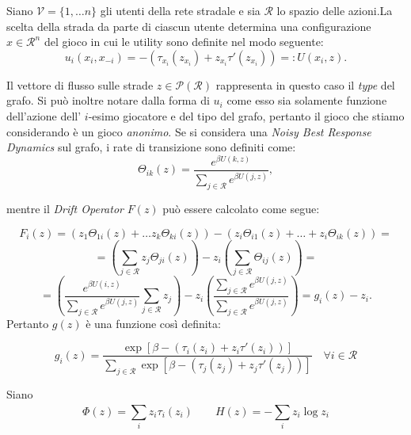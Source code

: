 \begin{alphaparts}
\questionpart %
Siano \(\mathcal{V} = \{1, \dots n\}\) gli utenti della rete stradale e sia \(\mathcal{R}\) lo spazio delle azioni.La scelta della strada da parte di ciascun utente determina una configurazione \(x \in \mathcal{R}^n\) del gioco in cui le utility sono definite nel modo seguente:
\[
    u_i (x_i, x_{- i}) = - (\tau_{x_i}(z_{x_i}) + z_{x_i}\tau'(z_{x_i})) = : U(x_{i}, z).\]

Il vettore di flusso sulle strade \(z \in \mathcal{P}(\mathcal{R})\) rappresenta in questo caso il \textit{type} del grafo. Si può inoltre notare dalla forma di \(u_i\) come esso sia solamente funzione dell'azione dell' \(i\)-esimo giocatore e del tipo del grafo, pertanto il gioco che stiamo considerando è un gioco \textit{anonimo}. Se si considera una \textit{Noisy Best Response Dynamics} sul grafo, i rate di transizione sono definiti come:
\begin{equation*}
    \Theta_{ik}(z) = \frac{e^{\beta U(k, z)}}{ \sum \limits_{j \in \mathcal{R}}^{} e^{\beta U(j, z)}},
\end{equation*} 

mentre il \textit{Drift Operator} \(F(z)\) può essere calcolato come segue:

\[
F_i(z) = (z_1 \Theta_{1i}(z) + \dots z_k \Theta_{ki}(z) ) - (z_i \Theta_{i1}(z) + \dots + z_i \Theta_{ik}(z) ) =
\]
\[ 
 = \left(\sum \limits_{j \in \mathcal{R}}^{} z_j \Theta_{ji}(z) \right) - z_i \left( \sum \limits_{j \in \mathcal{R}}^{} \Theta_{ij}(z)\right) =    
\]
\[
    = \left(\frac{e^{\beta U(i, z)}}{ \sum \limits_{j \in \mathcal{R}}^{} e^{\beta U(j, z)}}  \sum \limits_{j \in \mathcal{R}}^{} z_j \right) - z_i \left( \frac{\sum \limits_{j \in \mathcal{R}}^{} e^{\beta U(j, z)}}{ \sum \limits_{j \in \mathcal{R}}^{} e^{\beta U(j, z)}}\right) = g_i(z) - z_i.
\]
Pertanto \(g(z)\) è una funzione così definita:

\begin{equation*}
    g_i(z) = \frac{\exp [\beta - (\tau_{i}(z_{i}) + z_{i}\tau'(z_{i})) ]}{ \sum \limits_{j \in \mathcal{R}}^{} \exp [\beta - (\tau_{j}(z_{j}) + z_{j}\tau'(z_{j})) ]} \quad \forall i \in \mathcal{R}
\end{equation*}

\questionpart %
Siano
\[
    \Phi(z) =  \sum \limits_{i}^{} z
    _i \tau_i(z_i) \quad \quad H(z) = -  \sum \limits_{i}^{} z_i \log z_i\]


\end{alphaparts}
